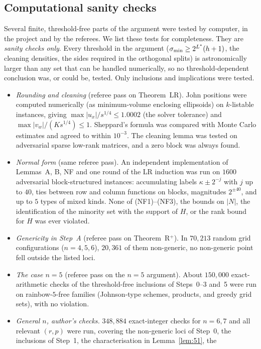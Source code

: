 \subsection{Computational sanity checks}
Several finite, threshold-free parts of the argument were tested by computer, in the project and by the referees.
We list these tests for completeness. They are \emph{sanity checks only}. Every threshold in the argument
($\sigma_{\min}\ge2^{L^{\ast}}(h+1)$, the cleaning densities, the sides required in the orthogonal splits) is astronomically
larger than any set that can be handled numerically, so no threshold-dependent conclusion was, or could be,
tested. Only inclusions and implications were tested.
\begin{itemize}[leftmargin=1.5em]
\item \emph{Rounding and cleaning} (referee pass on Theorem~LR). John positions were computed numerically (as
  minimum-volume enclosing ellipsoids) on $k$-listable instances, giving $\max|u_x|/s^{1/4}\le1.0002$ (the solver
  tolerance) and $\max|v_w|/(Ks^{1/4})\le1$. Sheppard's formula was compared with Monte Carlo estimates and agreed to
  within $10^{-3}$. The cleaning lemma was tested on adversarial sparse low-rank matrices, and a zero block was always
  found.
\item \emph{Normal form} (same referee pass). An independent implementation of Lemmas~A, B, NF and one round of the LR
  induction was run on $1600$ adversarial block-structured instances: accumulating labels $\kappa\pm2^{-j}$ with $j$ up
  to $40$, ties between row and column functions on blocks, magnitudes $2^{\pm40}$, and up to $5$ types of mixed kinds.
  None of (NF1)--(NF3), the bounds on $|N|$, the identification of the minority set with the support of $H$, or the
  rank bound for $H$ was ever violated.
\item \emph{Genericity in Step~A} (referee pass on Theorem~R$^+$). In $70{,}213$ random grid configurations
  ($n=4,5,6$), $20{,}361$ of them non-generic, no non-generic point fell outside the listed loci.
\item \emph{The case $n=5$} (referee pass on the $n=5$ argument). About $150{,}000$ exact-arithmetic checks of the
  threshold-free inclusions of Steps~0--3 and~5 were run on rainbow-$5$-free families (Johnson-type schemes, products, and
  greedy grid sets), with no violation.
\item \emph{General $n$, author's checks.} $348{,}884$ exact-integer checks for $n=6,7$ and all relevant $(r,p)$ were run,
  covering the non-generic loci of Step~0, the inclusions of Step~1, the characterisation in Lemma~\ref{lem:51}, the

\end{itemize}
